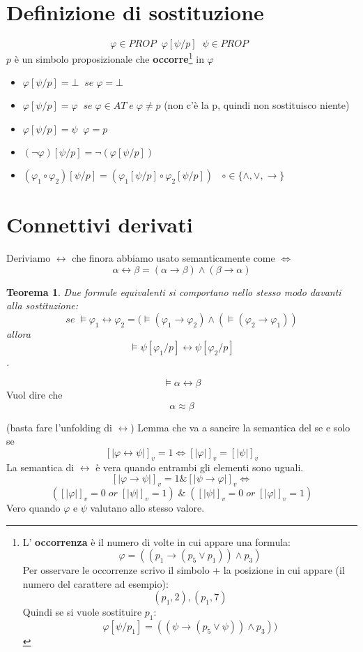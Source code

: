 \documentclass{article}
\newtheorem{theorem}{Teorema}
\theoremstyle{break}
\theoremstyle{break}
\theoremstyle{break}
\theoremstyle{break}
\begin{document}
\section{Definizione di sostituzione}
\begin{definition}
   \[
       \varphi \in PROP\;\; \varphi[\psi/p]\;\; \psi \in PROP\;\;
   \]  
   \( p \) è un simbolo proposizionale che \textbf{occorre}\footnote{L' \textbf{occorrenza} è il numero di volte
   in cui appare una formula:
\[
   \varphi=((p_1 \to (p_5 \vee p_1))\wedge p_3)
\] 
Per osservare le occorrenze scrivo il simbolo + la posizione in cui appare (il numero del carattere ad esempio):
\[
    (p_1, 2), (p_1, 7)
\]
Quindi se si vuole sostituire \( p_1 \): \[ \varphi[\psi/p_1] = ((\psi \to (p_5 \vee \psi))\wedge p_3)) \]
} in \( \varphi \)
\begin{itemize}
    \item \( \varphi[\psi/p] = \bot\;\; se\; \varphi = \bot \)
    \item \( \varphi[\psi/p] = \varphi\;\; se\;\varphi \in AT\; e\; \varphi \neq p \) (non c'è la p, quindi non sostituisco niente)
    \item \( \varphi[\psi/p] = \psi\;\; \varphi = p \) 
    \item \( (\neg \varphi)[\psi/p] =  \neg (\varphi[\psi/p])\) 
    \item \( (\varphi_1 \circ \varphi_2)[\psi/p]=(\varphi_1[\psi/p] \circ \varphi_2[\psi/p]) \)  \(\;\; \circ \in  \{ \wedge, \vee, \to  \} \) 
\end{itemize}
\end{definition}

\section{Connettivi derivati}
Deriviamo \( \leftrightarrow \) che finora abbiamo usato semanticamente come \( \Leftrightarrow \) 
\[
\alpha \leftrightarrow \beta = (\alpha \to \beta) \wedge (\beta \to \alpha)
\] 
\begin{theorem}
    Due formule equivalenti si comportano nello stesso modo davanti alla sostituzione:
    \[
    se\; \models \varphi_1 \leftrightarrow \varphi_2 = (\models (\varphi_1 \to \varphi_2) \wedge (\models (\varphi_2 \to \varphi_1))
    \] 
    allora
    \[
        \models \psi[\varphi_1/p] \leftrightarrow \psi[\varphi_2/p]
    \].
\end{theorem}
\[
    \models \alpha \leftrightarrow \beta
\] Vuol dire che
\[
    \alpha \approx \beta
\] 
\begin{exercise}[a casa]
    (basta fare l'unfolding di \( \leftrightarrow \))
    Lemma che va a sancire la semantica del se e solo se
    \[
        [|\varphi \leftrightarrow \psi|]_v=1 \Leftrightarrow [|\varphi|]_v=[|\psi|]_v
    \] 
    La semantica di \( \leftrightarrow \) è vera quando entrambi gli elementi sono uguali. 
    \[
        [|\varphi \to \psi|]_v=1 \& [|\psi \to \varphi|]_v \Leftrightarrow
    \] 
    \[
        ([|\varphi|]_v=0\; or\; [|\psi|]_v=1)\; \&\; ([|\psi|]_v=0\; or\; [|\varphi|]_v=1) 
    \] 
    Vero quando \( \varphi \) e \( \psi \) valutano allo stesso valore.
\end{exercise}
\end{document}
